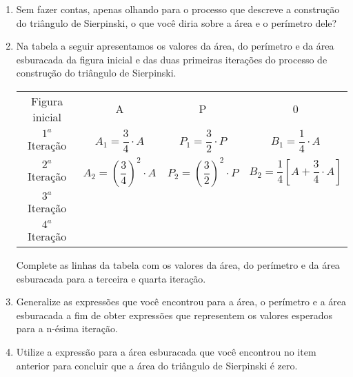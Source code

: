 \documentclass[10 pt,usenames,dvipsnames, oneside]{article}
\begin{document}
\begin{enumerate}

\item{}
Sem fazer contas, apenas olhando para o processo que descreve a construção do triângulo de Sierpinski, o que você diria sobre a área e o perímetro dele?

\item{}
Na tabela a seguir apresentamos os valores da área, do perímetro e da área esburacada da figura inicial e das duas primeiras iterações do processo de construção do triângulo de Sierpinski.

\begin{table}[H]
\centering
\setlength\tabulinesep{2.5pt}
\begin{tabu}{|c|c|c|c|}
\hline
{} &  &  &  \\ 
\hline
Figura inicial & A                                       & P                                       & 0                                                   \\ \hline
$1^a$ Iteração             & $A_1=\dfrac{3}{4}\cdot A$               & $P_1=\dfrac{3}{2}\cdot P$               & $B_1=\dfrac{1}{4}\cdot A$                           \\ \hline
$2^a$ Iteração             & $A_2=\left(\dfrac{3}{4}\right)^2\cdot A$ & $P_2=\left(\dfrac{3}{2}\right)^2\cdot P$ & $B_2=\dfrac{1}{4}\left[A+\dfrac{3}{4}\cdot A\right]$ \\ \hline
$3^a$ Iteração             &                    &                    &                                \\ \hline
$4^a$ Iteração             &                    &                    &                                \\ \hline
\end{tabu}
\end{table}

Complete as linhas da tabela com os valores da área, do perímetro e da área esburacada para a terceira e quarta iteração.

\item{}
Generalize as expressões que você encontrou para a área, o perímetro e a área esburacada a fim de obter expressões que representem os valores esperados para a n-ésima iteração.

\item{}
Utilize a expressão para a área esburacada que você encontrou no item anterior para concluir que a área do triângulo de Sierpinski é zero.

\end{enumerate}
\end{document}
